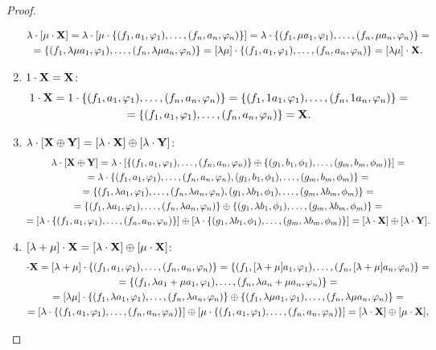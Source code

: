 \documentclass{article}
\theoremstyle{definition}
\newcommand{\0}{\ensuremath{\vb{0}}}
\newcommand{\X}{\ensuremath{\vb{X}}}
\newcommand{\Y}{\ensuremath{\vb{Y}}}
\begin{document}
\begin{proof}
\begin{enumerate}
\begin{multline*}
            \lambda\cdot[\mu\cdot \X]=\lambda\cdot\left[\mu\cdot\{(f_1,a_1,\varphi_1),\ldots,(f_n,a_n,\varphi_n)\}\right]=\lambda\cdot\{(f_1,\mu a_1,\varphi_1),\ldots,(f_n,\mu a_n,\varphi_n)\}=\\=\{(f_1,\lambda\mu a_1,\varphi_1),\ldots,(f_n,\lambda\mu a_n,\varphi_n)\}=[\lambda\mu]\cdot\{(f_1,a_1,\varphi_1),\ldots,(f_n,a_n,\varphi_n)\}=[\lambda\mu]\cdot \X.
        \end{multline*}
        \item $1\cdot \X=\X$:
        \begin{multline*}
            1\cdot\X=1\cdot\{(f_1,a_1,\varphi_1),\ldots,(f_n,a_n,\varphi_n)\}=\{(f_1,1a_1,\varphi_1),\ldots,(f_n,1a_n,\varphi_n)\}=\\=\{(f_1,a_1,\varphi_1),\ldots,(f_n,a_n,\varphi_n)\}=\X.
        \end{multline*}
        \item $\lambda\cdot[\X\oplus\Y]=[\lambda\cdot \X]\oplus[\lambda\cdot \Y]$:
        \begin{multline*}
            \lambda\cdot[\X\oplus \Y]=\lambda\cdot[\{(f_1,a_1,\varphi_1),\ldots,(f_n,a_n,\varphi_n)\}\oplus\{(g_1,b_1,\phi_1),\ldots,(g_m,b_m,\phi_m)\}]=\\=\lambda\cdot\{(f_1, a_1,\varphi_1),\ldots,(f_n, a_n,\varphi_n),(g_1,b_1,\phi_1),\ldots,(g_m,b_m,\phi_m)\}=\\=\{(f_1,\lambda a_1,\varphi_1),\ldots,(f_n,\lambda a_n,\varphi_n),(g_1,\lambda b_1,\phi_1),\ldots,(g_m,\lambda b_m,\phi_m)\}=\\=\{(f_1,\lambda a_1,\varphi_1),\ldots,(f_n,\lambda a_n,\varphi_n)\}\oplus\{(g_1,\lambda b_1,\phi_1),\ldots,(g_m,\lambda b_m,\phi_m)\}=\\=[\lambda\cdot\{(f_1,a_1,\varphi_1),\ldots,(f_n,a_n,\varphi_n)\}]\oplus[\lambda\cdot\{(g_1,\lambda b_1,\phi_1),\ldots,(g_m,\lambda b_m,\phi_m)\}]=[\lambda\cdot \X]\oplus[\lambda\cdot \Y].
        \end{multline*}
        \item $[\lambda+\mu]\cdot \X=[\lambda \cdot \X] \oplus[\mu \cdot \X]$:
        \begin{multline*}
            [\lambda+\mu]\cdot \X=[\lambda+\mu]\cdot\{(f_1,a_1,\varphi_1),\ldots,(f_n,a_n,\varphi_n)\}=\{(f_1,[\lambda+\mu]a_1,\varphi_1),\ldots,(f_n,[\lambda+\mu]a_n,\varphi_n)\}=\\=\{(f_1,\lambda a_1+\mu a_1,\varphi_1),\ldots,(f_n,\lambda a_n+\mu a_n,\varphi_n)\}=\\=[\lambda\mu]\cdot\{(f_1,\lambda a_1,\varphi_1),\ldots,(f_n,\lambda a_n,\varphi_n)\}\oplus\{(f_1,\lambda\mu a_1,\varphi_1),\ldots,(f_n,\lambda\mu a_n,\varphi_n)\}=\\=[\lambda\cdot\{(f_1,a_1,\varphi_1),\ldots,(f_n,a_n,\varphi_n)\}]\oplus[\mu\cdot\{(f_1,a_1,\varphi_1),\ldots,(f_n,a_n,\varphi_n)\}]=[\lambda \cdot \X] \oplus[\mu \cdot \X],

\end{multline*}
\end{enumerate}
\end{proof}
\end{document}
